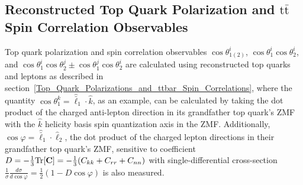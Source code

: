 \begin{refsection}
\section{Reconstructed Top Quark Polarization and \ensuremath{\mathrm{t\bar{t}}} Spin Correlation Observables}
\label{Reconstructed_Polarization_Spin_Correlation_Observables}
Top quark polarization and \ttbar spin correlation observables $\cos\theta_{1(2)}^i$, $\cos \theta_1^i \cos \theta_2^i$, and $\cos \theta_1^i \cos \theta_2^j \pm \cos \theta_1^j \cos \theta_2^i$ are calculated using reconstructed top quarks and leptons as described in section~\ref{Top_Quark_Polarizations_and_ttbar_Spin_Correlations}, where the quantity $\cos \theta_1^k = \hat{\bar{\ell}}_1 \cdot \hat{k}$, as an example, can be calculated by taking the dot product of the charged anti-lepton direction in its grandfather top quark's ZMF with the $\hat{k}$ helicity basis spin quantization axis in the \ttbar ZMF.
Additionally, $\cos\varphi=\hat{\bar{\ell}}_{1} \cdot \hat{\ell}_2$, the dot product of the charged lepton directions in their grandfather top quark's ZMF, sensitive to coefficient $D = -\frac{1}{3}\text{Tr}[\mathbf{C}] = -\frac{1}{3}(C_{kk} + C_{rr} + C_{nn})$ with single-differential cross-section $\tfrac{1}{\sigma}\tfrac{d\sigma}{d\cos\varphi} = \tfrac{1}{2}(1-D\cos\varphi)$ is also measured.

\end{refsection}
